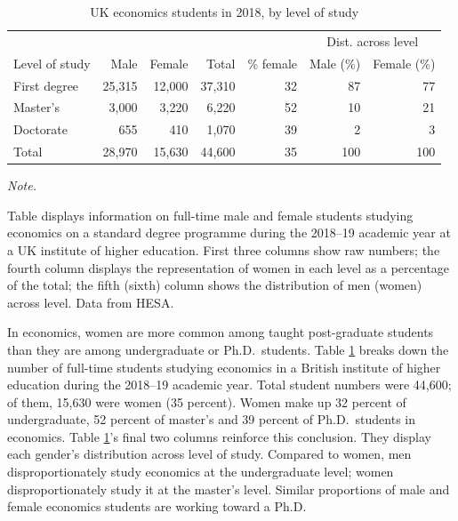 \documentclass[a4paper, 1]{article}
\begin{document}
\begin{table}[!h]

\caption{\label{tab:level}UK economics students in 2018, by level of study}
\centering
\begin{threeparttable}
\begin{tabular}[t]{lrrrrrr}
\toprule
\multicolumn{1}{c}{} & \multicolumn{4}{c}{ } & \multicolumn{2}{c}{Dist. across level} \\
\cmidrule(l{3pt}r{3pt}){6-7}
Level of study & Male & Female & Total & \% female & Male (\%) & Female (\%)\\
\midrule
First degree & 25,315 & 12,000 & 37,310 & 32 & 87 & 77\\
Master's & 3,000 & 3,220 & 6,220 & 52 & 10 & 21\\
Doctorate & 655 & 410 & 1,070 & 39 & 2 & 3\\
\midrule
Total & 28,970 & 15,630 & 44,600 & 35 & 100 & 100\\
\bottomrule
\end{tabular}
\begin{tablenotes}[para]
\item \textit{Note.}
\item Table displays information on full-time male and female students studying economics on a standard degree programme during the 2018--19 academic year at a UK institute of higher education. First three columns show raw numbers; the fourth column displays the representation of women in each level as a percentage of the total; the fifth (sixth) column shows the distribution of men (women) across level. Data from HESA.
\end{tablenotes}
\end{threeparttable}
\end{table}



In economics, women are more common among taught post-graduate students than they are among undergraduate or Ph.D.~students. Table \ref{tab:level} breaks down the number of full-time students studying economics in a British institute of higher education during the 2018--19 academic year. Total student numbers were 44,600; of them, 15,630 were women (35 percent). Women make up 32 percent of undergraduate, 52 percent of master's and 39 percent of Ph.D.~students in economics. Table \ref{tab:level}'s final two columns reinforce this conclusion. They display each gender's distribution across level of study. Compared to women, men disproportionately study economics at the undergraduate level; women disproportionately study it at the master's level. Similar proportions of male and female economics students are working toward a Ph.D.
\end{document}
